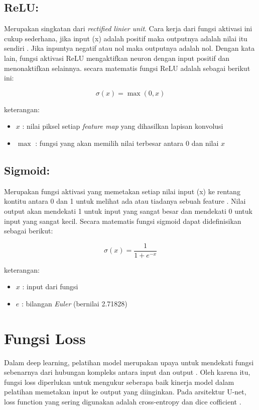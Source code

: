 \subsection{ReLU:}
Merupakan singkatan dari \textit{rectified linier unit}. Cara kerja dari fungsi aktivasi ini cukup sederhana, jika input (x) adalah positif maka outputnya adalah nilai itu sendiri \cite{younisse_fine-tuning_2023}. Jika inpuntya negatif atau nol maka outputnya adalah nol. Dengan kata lain, fungsi aktivasi ReLU mengaktifkan neuron dengan input positif dan menonaktifkan selainnya. secara matematis fungsi ReLU adalah sebagai berikut ini: 

\begin{equation}
	\sigma(x) = \max(0, x)
\end{equation}

\noindent
keterangan:
\begin{itemize}
	\item $x$ : nilai piksel setiap \textit{feature map} yang dihasilkan lapisan konvolusi
	\item $\max$ : fungsi yang akan memilih nilai terbesar antara 0 dan nilai $x$
\end{itemize}

\subsection{Sigmoid:}
Merupakan fungsi aktivasi yang memetakan setiap nilai input (x) ke rentang kontitu antara 0 dan 1 untuk melihat ada atau tiadanya sebuah feature \cite{younisse_fine-tuning_2023}. Nilai output akan mendekati 1 untuk input yang sangat besar dan mendekati 0 untuk input yang sangat kecil. Secara matematis fungsi sigmoid dapat didefinisikan sebagai berikut:

\begin{equation}
	\sigma(x) = \frac{1}{1 + e^{-x}}
\end{equation}

\noindent
keterangan:
\begin{itemize}
	\item $x$ : input dari fungsi
	\item $e$ : bilangan \textit{Euler} (bernilai 2.71828)
\end{itemize}


\section{Fungsi Loss}

\noindent Dalam deep learning, pelatihan model merupakan upaya untuk mendekati fungsi sebenarnya dari hubungan kompleks antara input dan output \cite{dawani_hands-mathematics_2020}. Oleh karena itu, fungsi loss diperlukan untuk mengukur seberapa baik kinerja model dalam pelatihan memetakan input ke output yang diinginkan. Pada arsitektur U-net, loss function yang sering digunakan adalah cross-entropy dan dice cofficient \cite{huang_fully_2022}.  

